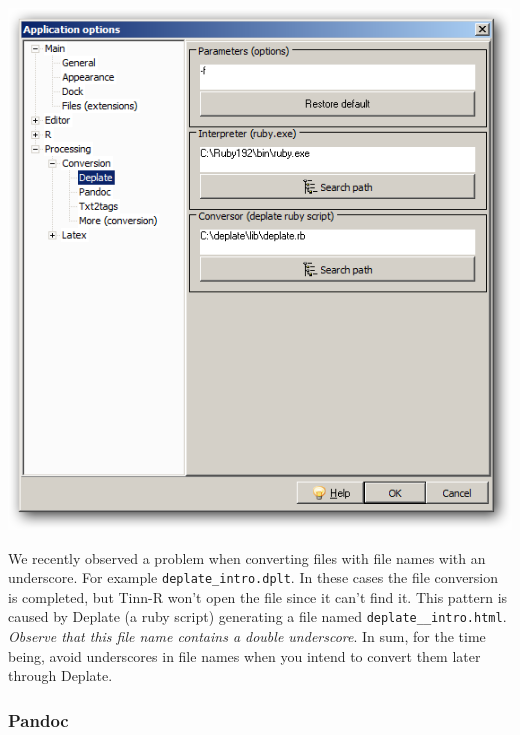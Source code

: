 \begin{itemize}
\begin{enumerate}
        \includegraphics[scale=0.50]{./res/app_processing_conversion_deplate.png}\\
    \end{enumerate}
\end{itemize}

We recently observed a problem when converting files with file names with an
underscore. For example \texttt{deplate\_intro.dplt}. In these cases the file
conversion is completed, but Tinn-R won't open the file since it can't find it.
This pattern is caused by Deplate (a ruby script) generating a file named
\texttt{deplate\_\_intro.html}. \textit{Observe that this file name contains a
  double underscore}. In sum, for the time being, avoid underscores in file
names when you intend to convert them later through Deplate.


\subsubsection{Pandoc}

